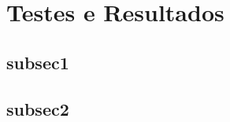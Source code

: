 \chapter{Testes e Resultados}
	\begin{myenv}{1.5}
		
		\section{subsec1}
		\section{subsec2}
		
	\end{myenv}